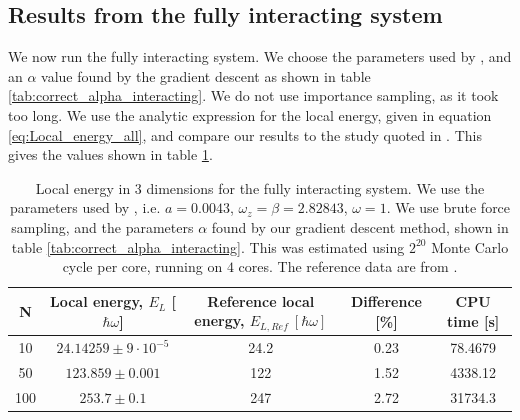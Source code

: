 \documentclass[a4paper, 10pt]{article}
\begin{document}
	\subsection{Results from the fully interacting system}
	We now run the fully interacting system. We choose the parameters used by \cite{Nilsen2005}, and an $\alpha$ value found by the gradient descent as shown in table \ref{tab:correct_alpha_interacting}. We do not use importance sampling, as it took too long. We use the analytic expression for the local energy, given in equation \ref{eq:Local_energy_all}, and  compare our results to the study quoted in \cite{Kristiansen2016}. This gives the values shown in table \ref{tab:fully_interacting_system}.
	\begin{table}[ht!]
		\caption{Local energy in 3 dimensions for the fully interacting system. We use the parameters used by \cite{Nilsen2005}, i.e. $a=0.0043$, $\omega_z=\beta=2.82843$, $\omega=1$. We use brute force sampling, and the parameters $\alpha$ found by our gradient descent method, shown in table \ref{tab:correct_alpha_interacting}. This was estimated using $2^{20}$ Monte Carlo cycle per core, running on $4$ cores. The reference data are from \cite{Kristiansen2016}.}\label{tab:fully_interacting_system}
		\centering
		\begin{tabular}{ccccc}
			N & Local energy, $E_L$ [$\hbar \omega$] &Reference local energy, $E_{L,Ref}\ [\hbar \omega]$&Difference [\%]& CPU time [s]\\
			\hline
			10 & $24.14259\pm 9\cdot 10^{-5}$ &24.2&0.23& 78.4679\\
			50 & $123.859\pm 0.001$ &122& 1.52&4338.12\\
			100 & $253.7\pm 0.1$&247&2.72 &31734.3\\
		\end{tabular}
	\end{table}
	\pagebreak
\end{document}
